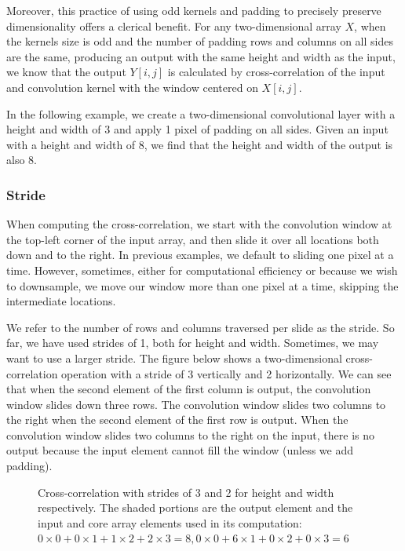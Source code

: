 Moreover, this practice of using odd kernels and padding to precisely preserve dimensionality offers a clerical benefit. For any two-dimensional array $X$, when the kernels size is odd and the number of padding rows and columns on all sides are the same, producing an output with the same height and width as the input, we know that the output $Y[i,j]$ is calculated by cross-correlation of the input and convolution kernel with the window centered on $X[i,j]$.

In the following example, we create a two-dimensional convolutional layer with a height and width of 3 and apply 1 pixel of padding on all sides. Given an input with a height and width of 8, we find that the height and width of the output is also 8.

\subsubsection{Stride}

When computing the cross-correlation, we start with the convolution window at the top-left corner of the input array, and then slide it over all locations both down and to the right. In previous examples, we default to sliding one pixel at a time. However, sometimes, either for computational efficiency or because we wish to downsample, we move our window more than one pixel at a time, skipping the intermediate locations.

We refer to the number of rows and columns traversed per slide as the stride. So far, we have used strides of 1, both for height and width. Sometimes, we may want to use a larger stride. The figure below shows a two-dimensional cross-correlation operation with a stride of 3 vertically and 2 horizontally. We can see that when the second element of the first column is output, the convolution window slides down three rows. The convolution window slides two columns to the right when the second element of the first row is output. When the convolution window slides two columns to the right on the input, there is no output because the input element cannot fill the window (unless we add padding).

\begin{figure}[hpt]
	\centering
	
	\caption{Cross-correlation with strides of 3 and 2 for height and width respectively. The shaded portions are the output element and the input and core array elements used in its computation: $0\times0+0\times1+1\times2+2\times3=8,  0\times0+6\times1+0\times2+0\times3=6$}
	\label{fig:conv_stride}
\end{figure}

